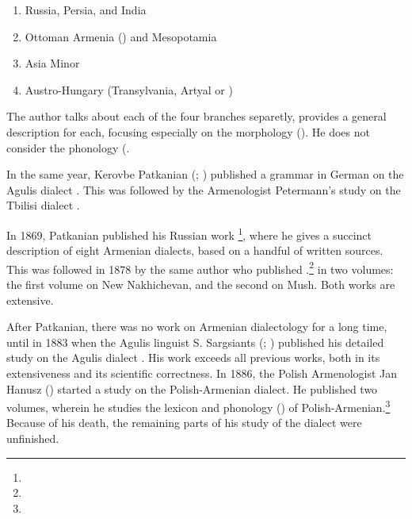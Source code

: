 \begin{adjarianpage}\label{page:2}\end{adjarianpage}%

\begin{enumerate}[noitemsep]
	\item Russia, Persia, and India
	\item Ottoman Armenia () and Mesopotamia
	\item Asia Minor
	\item Austro-Hungary (Transylvania, Artyal or )
	
\end{enumerate}

The author talks about each of the four branches separetly, provides a general description for each, focusing especially on the morphology (). He does not consider the phonology (. 

In the same year, Kerovbe Patkanian (; ) published a grammar in German on the Agulis dialect \citep{Patkanoff-1866-Agulis}. This was followed by the Armenologist Petermann's study on the Tbilisi dialect \citep{Petermann-1867-Tiflis}.

In 1869, Patkanian published his Russian work \citep{Patkanian-1869-RussianDialects}\footnote{}, where he gives a succinct description of eight Armenian dialects, based on a handful of written sources. This was followed in 1878 by the same author who published \citet{Patkanian-1875-RussianDialects}.\footnote{} in two volumes: the first volume on New Nakhichevan, and the second on Mush. Both works are extensive.

After Patkanian, there was no work on Armenian dialectology for a long time, until in 1883 when the Agulis linguist S. Sargsiants (; ) published his detailed study on the Agulis dialect \citet{Sargiants-1883-Agulis}. His work exceeds all previous works, both in its extensiveness and its scientific correctness. In 1886, the Polish Armenologist Jan Hanusz () started a study on the Polish-Armenian dialect. He published two volumes, wherein he studies the lexicon and phonology () of Polish-Armenian.\footnote{} Because of his death, the remaining parts of his study of the dialect were unfinished. 

